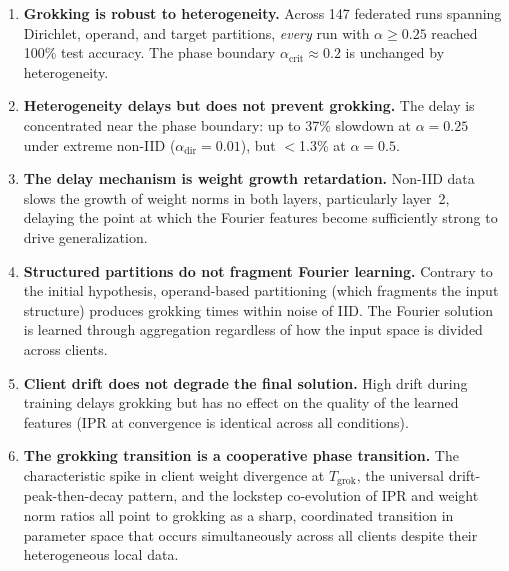 \begin{enumerate}
  \item \textbf{Grokking is robust to heterogeneity.}  Across 147 federated
        runs spanning Dirichlet, operand, and target partitions,
        \emph{every} run with $\alpha \geq 0.25$ reached 100\% test
        accuracy.  The phase boundary $\alpha_{\mathrm{crit}} \approx 0.2$
        is unchanged by heterogeneity.

  \item \textbf{Heterogeneity delays but does not prevent grokking.}
        The delay is concentrated near the phase boundary: up to 37\%
        slowdown at $\alpha{=}0.25$ under extreme non-IID
        ($\alpha_{\mathrm{dir}}{=}0.01$), but $<$1.3\% at $\alpha{=}0.5$.

  \item \textbf{The delay mechanism is weight growth retardation.}
        Non-IID data slows the growth of weight norms in both layers,
        particularly layer~2, delaying the point at which the Fourier
        features become sufficiently strong to drive generalization.

  \item \textbf{Structured partitions do not fragment Fourier learning.}
        Contrary to the initial hypothesis, operand-based partitioning
        (which fragments the input structure) produces grokking times
        within noise of IID.  The Fourier solution is learned through
        aggregation regardless of how the input space is divided across
        clients.

  \item \textbf{Client drift does not degrade the final solution.}  High
        drift during training delays grokking but has no effect on the
        quality of the learned features (IPR at convergence is identical
        across all conditions).

  \item \textbf{The grokking transition is a cooperative phase transition.}
        The characteristic spike in client weight divergence at
        $T_{\mathrm{grok}}$, the universal drift-peak-then-decay pattern,
        and the lockstep co-evolution of IPR and weight norm ratios all
        point to grokking as a sharp, coordinated transition in parameter
        space that occurs simultaneously across all clients despite their
        heterogeneous local data.
\end{enumerate}
